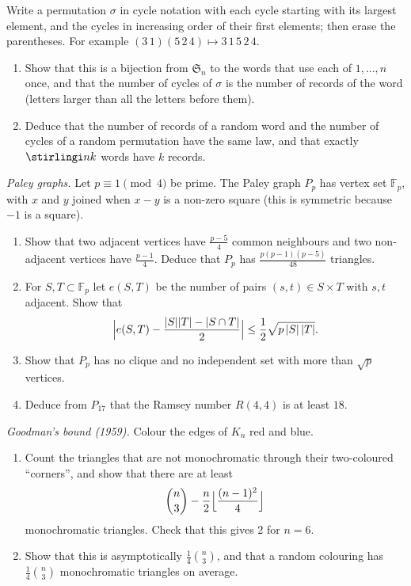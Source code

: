 \begin{exercise}[$\star$]\label{pb:foata}
Write a permutation $\sigma$ in cycle notation with each cycle starting with its largest element, and the cycles in increasing
order of their first elements; then erase the parentheses. For example $(3\,1)(5\,2\,4)\mapsto3\,1\,5\,2\,4$.
\begin{enumerate}[label=(\alph*)]
\item Show that this is a bijection from $\mathfrak S_n$ to the words that use each of $1,\dots,n$ once, and that the number of
cycles of $\sigma$ is the number of records of the word (letters larger than all the letters before them).
\item Deduce that the number of records of a random word and the number of cycles of a random permutation have the same
law, and that exactly $\stirlingi nk$ words have $k$ records.
\end{enumerate}
\end{exercise}

\begin{exercise}[$\star\star$]\label{pb:paley}
\emph{Paley graphs.} Let $p\equiv1\pmod4$ be prime. The Paley graph $P_p$ has vertex set $\mathbb F_p$, with $x$ and $y$ joined
when $x-y$ is a non-zero square (this is symmetric because $-1$ is a square).
\begin{enumerate}[label=(\alph*)]
\item Show that two adjacent vertices have $\frac{p-5}4$ common neighbours and two non-adjacent vertices have $\frac{p-1}4$.
Deduce that $P_p$ has $\frac{p(p-1)(p-5)}{48}$ triangles.
\item For $S,T\subset\mathbb F_p$ let $e(S,T)$ be the number of pairs $(s,t)\in S\times T$ with $s,t$ adjacent. Show that
\[
\Bigl|e(S,T)-\frac{|S||T|-|S\cap T|}2\Bigr|\le\frac12\sqrt{p\,|S|\,|T|}.
\]
\item Show that $P_p$ has no clique and no independent set with more than $\sqrt p$ vertices.
\item Deduce from $P_{17}$ that the Ramsey number $R(4,4)$ is at least $18$.
\end{enumerate}
\end{exercise}

\begin{exercise}[$\star\star$]\label{pb:goodman}
\emph{Goodman's bound (1959).} Colour the edges of $K_n$ red and blue.
\begin{enumerate}[label=(\alph*)]
\item Count the triangles that are not monochromatic through their two-coloured ``corners'', and show that there are at least
\[
\binom n3-\frac n2\Bigl\lfloor\frac{(n-1)^2}4\Bigr\rfloor
\]
monochromatic triangles. Check that this gives $2$ for $n=6$.
\item Show that this is asymptotically $\frac14\binom n3$, and that a random colouring has $\frac14\binom n3$ monochromatic triangles on average.
\end{enumerate}
\end{exercise}

